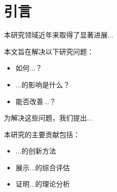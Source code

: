 \section{引言}
\label{sec:introduction}




本研究领域近年来取得了显著进展...



本文旨在解决以下研究问题：
\begin{itemize}
    \item 如何...？
    \item ...的影响是什么？
    \item 能否改善...？
\end{itemize}

为解决这些问题，我们提出...

本研究的主要贡献包括：
\begin{itemize}
    \item ...的创新方法
    \item 展示...的综合评估
    \item 证明...的理论分析
\end{itemize}

